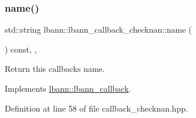 \subsubsection{\texorpdfstring{name()}{name()}}
{\footnotesize\ttfamily std\+::string lbann\+::lbann\+\_\+callback\+\_\+checknan\+::name (\begin{DoxyParamCaption}{ }\end{DoxyParamCaption}) const\hspace{0.3cm}{\ttfamily [inline]}, {\ttfamily [override]}, {\ttfamily [virtual]}}

Return this callback\textquotesingle{}s name. 

Implements \hyperlink{classlbann_1_1lbann__callback_a7522c7a14f1d6a1ea762cc2d7248eb3a}{lbann\+::lbann\+\_\+callback}.



Definition at line 58 of file callback\+\_\+checknan.\+hpp.


